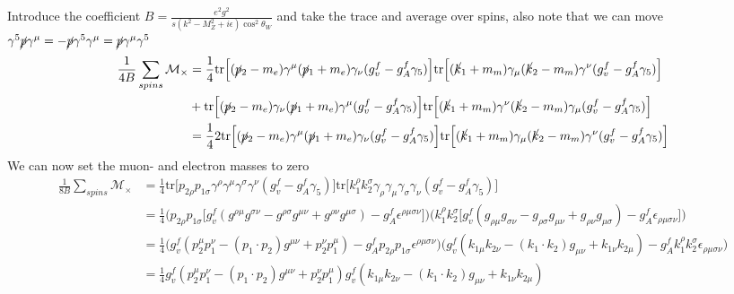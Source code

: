 \documentclass[11pt]{article}
\begin{document}
\begin{flushleft}
Introduce the coefficient  $B = \frac{e^2 g^2}{s(k^2 - M_Z^2 + i \epsilon)\cos^2 \theta_W}$ and take the trace and average over spins, also note that we can move $\gamma^5 \cancel{p}\gamma^{\mu}= -\cancel{p} \gamma^5 \gamma^{\mu} = \cancel{p}\gamma^{\mu} \gamma^5$
\begin{align*}
\frac{1}{4B} \sum_{spins} \mathcal{M}_{\times} &= \frac{1}{4} \text{tr} \Big[
 (\cancel{p}_2 - m_e) \gamma^{\mu} (\cancel{p}_1 + m_e) \gamma_{\nu} (g_v^f - g_A^f \gamma_5) \Big] \text{tr} \Big[(\cancel{k}_1 + m_m) \gamma_{\mu} (\cancel{k}_2 - m_m) \gamma^{\nu} (g_v^f - g_A^f \gamma_5) \Big] \\
&+ \text{tr} \Big[
(\cancel{p}_2 - m_e) \gamma_{\nu}(\cancel{p}_1 + m_e) \gamma^{\mu} (g_v^f - g_A^f \gamma_5)  \Big]
\text{tr}
\Big[
(\cancel{k}_1 +m_m) \gamma^{\nu}  (\cancel{k}_2 -m_m) \gamma_{\mu} (g_v^f - g_A^f \gamma_5) \Big] \\
&= \frac{1}{4} 2 \text{tr} \Big[
 (\cancel{p}_2 - m_e) \gamma^{\mu} (\cancel{p}_1 + m_e) \gamma_{\nu} (g_v^f - g_A^f \gamma_5) \Big] \text{tr} \Big[(\cancel{k}_1 + m_m) \gamma_{\mu} (\cancel{k}_2 - m_m) \gamma^{\nu} (g_v^f - g_A^f \gamma_5) \Big]
\end{align*}
We can now set the muon- and electron masses to zero
\begin{align*}
\frac{1}{8B} \sum_{spins} \mathcal{M}_{\times} &= \frac{1}{4} \text{tr} \Big[ p_{2 \rho} p_{1 \sigma}\gamma^{\rho}
\gamma^{\mu} \gamma^{\sigma} \gamma^{\nu} (g_v^f - g_A^f \gamma_5) \Big] \text{tr} \Big[ k_1^{\rho} k_2^{\sigma} \gamma_{\rho} \gamma_{\mu} \gamma_{\sigma} \gamma_{\nu} (g_v^f - g_A^f \gamma_5) \Big] \\
&= \frac{1}{4} \Big( p_{2 \rho} p_{1 \sigma} \big[ g_v^f(g^{\rho \mu} g^{\sigma \nu} - g^{\rho \sigma}g^{\mu \nu} + g^{\rho \nu}g^{\mu \sigma}) - g_A^f \epsilon^{\rho \mu \sigma \nu} \big] \Big)
\Big( k_1^{\rho} k_2^{\sigma}  \big[ g_v^f (g_{\rho \mu} g_{\sigma \nu} - g_{\rho \sigma}g_{\mu \nu} + g_{\rho \nu}g_{\mu \sigma})- g_A^f \epsilon_{\rho \mu \sigma \nu}\big] \Big) \\
&= \frac{1}{4} \Big( g_v^f(p_2^{\mu} p_1^{\nu} - (p_1 \cdot p_2)g^{\mu \nu} + p_2^{\nu} p_1^{\mu}) - g_A^f p_{2 \rho} p_{1 \sigma}\epsilon^{\rho \mu \sigma \nu}  \Big)
\Big(  g_v^f (k_{1 \mu} k_{2 \nu} - (k_1 \cdot k_2)g_{\mu \nu} + k_{1 \nu} k_{2 \mu})- g_A^f k_1^{\rho} k_2^{\sigma} \epsilon_{\rho \mu \sigma \nu} \Big) \\
&= \frac{1}{4}
g_v^f(p_2^{\mu} p_1^{\nu} - (p_1 \cdot p_2)g^{\mu \nu} + p_2^{\nu} p_1^{\mu})
 g_v^f (k_{1 \mu} k_{2 \nu} - (k_1 \cdot k_2)g_{\mu \nu} + k_{1 \nu} k_{2 \mu}) \\

\end{align*}
\end{flushleft}
\end{document}
